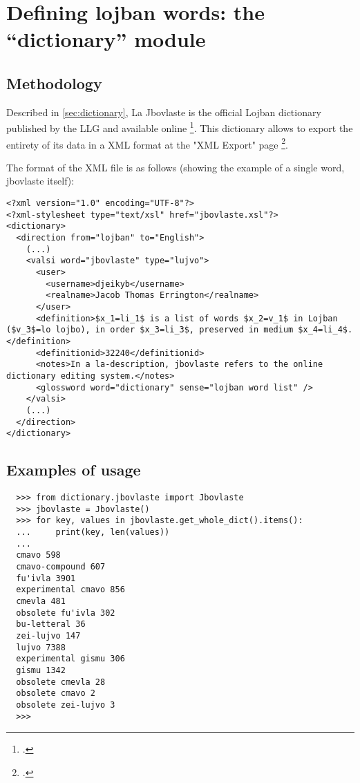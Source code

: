 \chapter{Defining lojban words: the ``dictionary'' module}
\label{chap:creating_a_dictionary}

\section{Methodology}

Described in \ref{sec:dictionary}, La Jbovlaste is the official Lojban dictionary published by the LLG and available online \footcite{jbovlaste}.
This dictionary allows to export the entirety of its data in a XML format at the "XML Export" page \footcite{jbovlaste-export}.\\

\newpage

The format of the XML file is as follows (showing the example of a single word, jbovlaste itself): \\

\begin{lstlisting}
<?xml version="1.0" encoding="UTF-8"?>
<?xml-stylesheet type="text/xsl" href="jbovlaste.xsl"?>
<dictionary>
  <direction from="lojban" to="English">
    (...)
    <valsi word="jbovlaste" type="lujvo">
      <user>
        <username>djeikyb</username>
        <realname>Jacob Thomas Errington</realname>
      </user>
      <definition>$x_1=li_1$ is a list of words $x_2=v_1$ in Lojban ($v_3$=lo lojbo), in order $x_3=li_3$, preserved in medium $x_4=li_4$.</definition>
      <definitionid>32240</definitionid>
      <notes>In a la-description, jbovlaste refers to the online dictionary editing system.</notes>
      <glossword word="dictionary" sense="lojban word list" />
    </valsi>
    (...)
  </direction>
</dictionary>
\end{lstlisting}

\section{Examples of usage}

\begin{lstlisting}
  >>> from dictionary.jbovlaste import Jbovlaste
  >>> jbovlaste = Jbovlaste()
  >>> for key, values in jbovlaste.get_whole_dict().items():
  ...     print(key, len(values))
  ...
  cmavo 598
  cmavo-compound 607
  fu'ivla 3901
  experimental cmavo 856
  cmevla 481
  obsolete fu'ivla 302
  bu-letteral 36
  zei-lujvo 147
  lujvo 7388
  experimental gismu 306
  gismu 1342
  obsolete cmevla 28
  obsolete cmavo 2
  obsolete zei-lujvo 3
  >>>
  \end{lstlisting}

